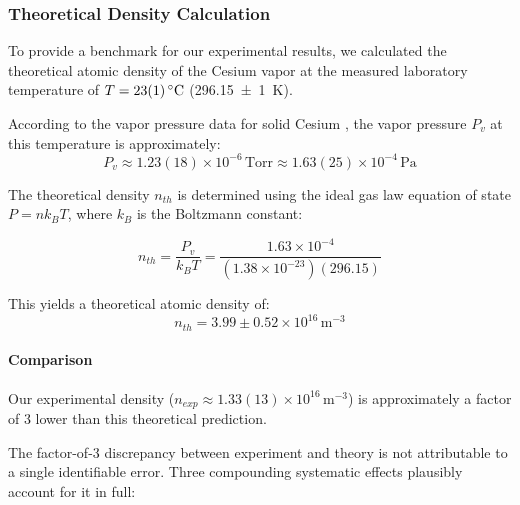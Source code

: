 \subsubsection{Theoretical Density Calculation}

To provide a benchmark for our experimental results, we calculated the theoretical atomic density of the Cesium vapor at the measured laboratory temperature of $T = \SI{23\pm1}{\celsius}$ (\SI{296.15\pm1}{\kelvin}).

According to the vapor pressure data for solid Cesium \cite{Steck_Quantum_Optics}, the vapor pressure $P_v$ at this temperature is approximately:
\begin{equation}
    P_v \approx 1.23 (18) \times 10^{-6} \, \text{Torr} \approx 1.63 (25) \times 10^{-4} \, \text{Pa}
\end{equation}



The theoretical density $n_{th}$ is determined using the ideal gas law equation of state $P = n k_B T$, where $k_B$ is the Boltzmann constant:

\begin{equation}
    n_{th} = \frac{P_v}{k_B T} = \frac{1.63 \times 10^{-4}}{(1.38 \times 10^{-23}) (296.15)}
\end{equation}

This yields a theoretical atomic density of:
\begin{equation}
    n_{th} = 3.99 \pm 0.52 \times 10^{16} \, \text{m}^{-3}
\end{equation}



\paragraph{Comparison}
Our experimental density ($n_{exp} \approx 1.33 (13) \times 10^{16} \, \text{m}^{-3}$) is approximately a factor of $3$ lower than this theoretical prediction.

The factor-of-3 discrepancy between experiment and theory is not attributable to a single identifiable error. 
Three compounding systematic effects plausibly account for it in full:


